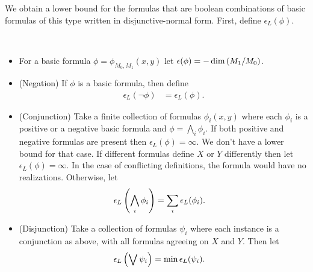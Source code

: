 We obtain a lower bound for the formulas that are boolean combinations of basic formulas of this type written in disjunctive-normal form.
First, define $\epsilon_L(\phi)$.

\begin{Definition} \ 
  \begin{itemize}
  \item For a basic formula $\phi = \phi_{M_0, M_1}(x, y)$ let $\epsilon(\phi) = -\dim \left(M_1/M_0\right)$.
  \item (Negation)
    If $\phi$ is a basic formula, then define
    \begin{align*}
      \epsilon_L(\neg \phi) &= \epsilon_L(\phi).
    \end{align*}
  \item (Conjunction)
    Take a finite collection of formulas $\phi_i(x, y)$ where each $\phi_i$ is a positive or a negative basic formula
    and $\phi = \bigwedge_i\phi_i$.
    If both positive and negative formulas are present then $\epsilon_L(\phi) = \infty$.
    We don't have a lower bound for that case.
    If different formulas define $X$ or $Y$ differently then let $\epsilon_L(\phi) = \infty$.
    In the case of conflicting definitions, the formula would have no realizations.
    Otherwise, let
    \begin{align*}
      \epsilon_L\left(\bigwedge_i \phi_i\right) &= \sum_i \epsilon_L(\phi_i).
    \end{align*}
  \item  (Disjunction)
    Take a collection of formulas $\psi_i$ where each instance is a conjunction as above,
    with all formulas agreeing on $X$ and $Y$.
    Then let
    \begin{align*}
      \epsilon_L\left(\bigvee \psi_i\right) &= \min \epsilon_L(\psi_i).
    \end{align*}
  \end{itemize}
\end{Definition}

